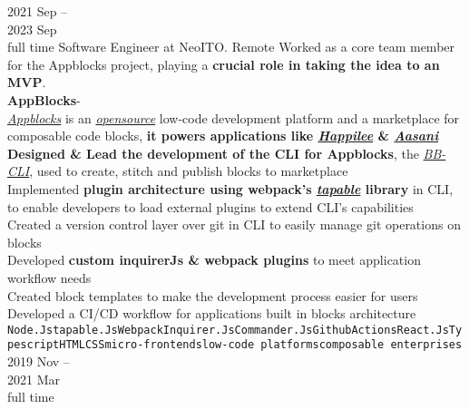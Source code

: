 \documentclass[9pt]{developercv} %
\begin{document}
\begin{entrylist}
	\entry
		{2021 Sep -- \\ 2023 Sep\\\footnotesize{full time}}
		{Software Engineer}
		{at}
		{NeoITO.}
		{Remote}
		{
			Worked as a core team member for the Appblocks project, playing a \textbf{crucial role in taking the idea to an MVP}.\smallskip\\
			\textbf{AppBlocks\texttrademark}\;-\;{\footnotesize\textcolor{darkgray}{ Low-code dev platform and marketplace.}}\\
			\href{https://www.appblocks.com/}{\emph{Appblocks}} is an \href{https://github.com/appblocks-hub}{\emph{opensource}} low-code development platform and a marketplace for composable code blocks, \textbf{it powers applications like \href{https://www.happilee.io/}{\emph{Happilee\texttrademark}} \& \href{https://www.aasanibooks.com/}{\emph{Aasani}\texttrademark}}\\
  			\faCaretRight\: \textbf{Designed \& Lead the development of the CLI for Appblocks}, the \href{https://github.com/appblocks-hub/BB-CLI}{\emph{BB-CLI}}, used to create, stitch and publish blocks to marketplace\\
			\faCaretRight\: Implemented \textbf{plugin architecture using webpack's \href{https://github.com/webpack/tapable}{\emph{tapable}} library} in CLI, to enable developers to load external plugins to extend CLI's capabilities\\
  			\faCaretRight\: Created a version control layer over git in CLI to easily manage git operations on blocks\\
			\faCaretRight\: Developed \textbf{custom inquirerJs \& webpack plugins} to meet application workflow needs\\
			\faCaretRight\: Created block templates to make the development process easier for users\\
			\faCaretRight\: Developed a CI/CD workflow for applications built in blocks architecture\\
			\texttt{Node.Js}\slashsep\texttt{tapable.Js}\slashsep\texttt{Webpack}\slashsep\texttt{Inquirer.Js}\slashsep\texttt{Commander.Js}\slashsep\texttt{GithubActions}\slashsep\texttt{React.Js}\slashsep\texttt{Typescript}\slashsep\texttt{HTML}\slashsep\texttt{CSS}\slashsep\texttt{micro-frontends}\slashsep\texttt{low-code platforms}\slashsep\texttt{composable enterprises}
		}
	\entry
		{2019 Nov --\\ 2021 Mar\\\footnotesize{full time}}

\end{entrylist}
\end{document}

